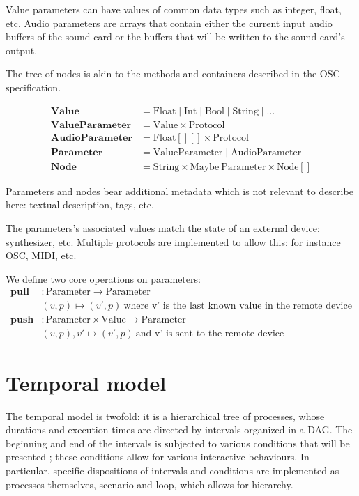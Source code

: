 \documentclass[applsci,article,submit,moreauthors,pdftex,10pt,a4paper]{mdpi}
\begin{document}
Value parameters can have values of common data types such as integer, float, etc.
Audio parameters are arrays that contain either the current input audio buffers of the sound card or the buffers that will be written to the sound card's output.

The tree of nodes is akin to the methods and containers described in the OSC specification.

\begin{align*}
\mathbf{Value} & = \mathrm{Float} \mid \mathrm{Int} \mid \mathrm{Bool} \mid \mathrm{String} \mid \dots \\
\mathbf{ValueParameter} & = \mathrm{Value} \times \mathrm{Protocol} \\
\mathbf{AudioParameter} & = \mathrm{Float[][]} \times \mathrm{Protocol} \\
\mathbf{Parameter} & = \mathrm{ValueParameter} \mid \mathrm{AudioParameter} \\
\mathbf{Node} & = \mathrm{String} \times \mathrm{Maybe}~\mathrm{Parameter} \times \mathrm{Node[]} 
\end{align*}

Parameters and nodes bear additional metadata which is not relevant to describe here: textual description, tags, etc.

The parameters's associated values match the state of an external device: synthesizer, etc.
Multiple protocols are implemented to allow this: for instance OSC, MIDI, etc.

We define two core operations on parameters: 
\begin{align*}
\mathbf{pull} & : \mathrm{Parameter} \rightarrow \mathrm{Parameter} \\
              & (v, p) \mapsto (v', p)~\text{where v' is the last known value in the remote device}\\
\mathbf{push} &: \mathrm{Parameter} \times \mathrm{Value} \rightarrow \mathrm{Parameter} \\
              & (v, p), v' \mapsto (v', p)~\text{and v' is sent to the remote device} 
\end{align*}

\section{Temporal model}
The temporal model is twofold: it is a hierarchical tree of processes, whose durations and execution times are directed by intervals organized in a \ac{DAG}. 
The beginning and end of the intervals is subjected to various conditions that will be presented ; these conditions allow for various 
interactive behaviours. %
In particular, specific dispositions of intervals and conditions are implemented as processes themselves, scenario and loop, which allows for hierarchy.
\end{document}
